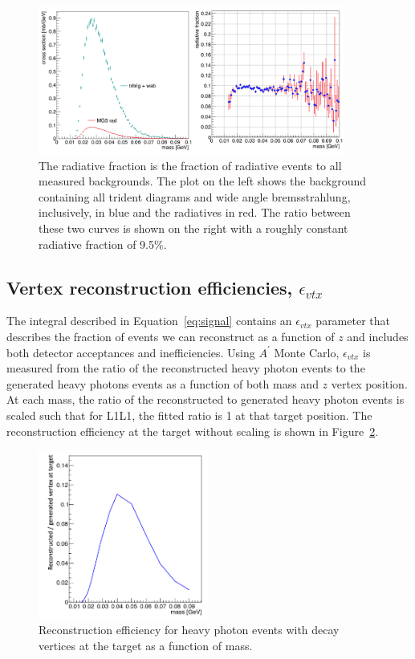 \begin{figure}[htb]
  \centering
      \includegraphics[width=0.9\textwidth]{pics/searching/radFrac.png}
  \caption[Radiative fraction from Monte Carlo]{The radiative fraction is the fraction of radiative events to all measured backgrounds. The plot on the left shows the background containing all trident diagrams and wide angle bremsstrahlung, inclusively, in blue and the radiatives in red. The ratio between these two curves is shown on the right with a roughly constant radiative fraction of 9.5$\%$.}
  \label{fig:radFrac}
\end{figure} 

\subsection{Vertex reconstruction efficiencies, $\epsilon_{vtx}$}
The integral described in Equation~\eqref{eq:signal} contains an $\epsilon_{vtx}$ parameter that describes the fraction of events we can reconstruct as a function of $z$ and includes both detector acceptances and inefficiencies. Using $A^{\prime}$ Monte Carlo, $\epsilon_{vtx}$ is measured from the ratio of the reconstructed heavy photon events to the generated heavy photons events as a function of both mass and $z$ vertex position. At each mass, the ratio of the reconstructed to generated heavy photon events is scaled such that for L1L1, the fitted ratio is 1 at that target position. The reconstruction efficiency at the target without scaling is shown in Figure~\ref{fig:rawEff}.

\begin{figure}[htb]
  \centering
      \includegraphics[width=0.5\textwidth]{pics/searching/rawEffL1L1.png}
  \caption[Reconstruction efficiency for heavy photons that decay at the target]{Reconstruction efficiency for heavy photon events with decay vertices at the target as a function of mass.}
  \label{fig:rawEff}
\end{figure} 

